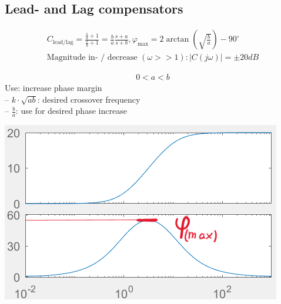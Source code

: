 \subsection{Lead- and Lag compensators}
    \begin{align*}
        C_{\text{lead/lag}} = \frac{\frac{s}{a} + 1}{\frac{s}{b} + 1} = \frac{b}{a} \frac{s+a}{s+b}, \varphi_{\text{max}} = 2 \arctan\left(\sqrt{\frac{b}{a}}\right) - 90^{\circ}\\
        \text{Magnitude in- / decrease } (\omega >> 1): |C(j \omega)| = \pm 20 dB
    \end{align*}
    
        \begin{minipage}{0.49\linewidth}
            \begin{align*}
                0 < a < b
            \end{align*}
            Use: increase phase margin\\
            – $k \cdot \sqrt{ab}$: desired crossover frequency\\
            – $\frac{b}{a}$: use for desired phase increase\\
        \end{minipage}
        \begin{minipage}{0.49\linewidth}
            \includegraphics[width = \linewidth]{src/images/lead-controller.png}
        \end{minipage}

